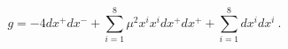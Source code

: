 \begin{equation}
 g = -4 d x^+ d x^- + \sum_{i=1}^8 \mu^2 x^i x^i dx^+ dx^+ 
  + \sum_{i=1}^8 d x^i dx^i ~.
\label{RRpp-wave}
\end{equation}


